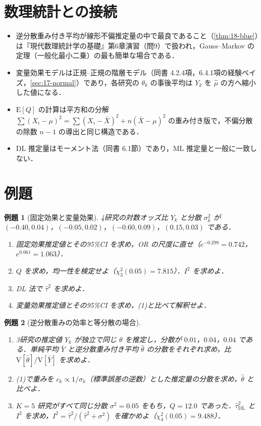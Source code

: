 \documentclass[a4paper,11pt,openany]{ltjsbook}
\newtheorem{reidai}{例題}[chapter]
\newcommand{\E}{\mathrm{E}}
\newcommand{\V}{\mathrm{V}}
\begin{document}
\section{数理統計との接続}\label{sec:18-link}
\begin{linkbox}
\begin{itemize}
\item 逆分散重み付き平均が線形不偏推定量の中で最良であること（\cref{thm:18-blue}）は『現代数理統計学の基礎』第6章演習（問9）で扱われ，Gauss--Markov の定理（一般化最小二乗）の最も簡単な場合である．
\item 変量効果モデルは正規--正規の階層モデル（同書 4.2.4項，6.4.1項の経験ベイズ，\cref{sec:17-normal}）であり，各研究の $\theta_k$ の事後平均は $Y_k$ を $\hat\mu$ の方へ縮小した値になる．
\item $\E[Q]$ の計算は平方和の分解 $\sum(X_i-\mu)^2=\sum(X_i-\bar X)^2+n(\bar X-\mu)^2$ の重み付き版で，不偏分散の除数 $n-1$ の導出と同じ構造である．
\item DL 推定量はモーメント法（同書 6.1節）であり，ML 推定量と一般に一致しない．
\end{itemize}
\end{linkbox}

\section{例題}\label{sec:18-ex}
\begin{reidai}[固定効果と変量効果]\label{reidai:18-1}
4研究の対数オッズ比 $Y_k$ と分散 $\sigma_k^2$ が $(-0.40,0.04)$，$(-0.05,0.02)$，$(-0.60,0.09)$，$(0.15,0.03)$ である．
\begin{enumerate}[label=(\arabic*)]
\item 固定効果推定値とその95\%CI を求め，OR の尺度に直せ（$e^{-0.298}=0.742$，$e^{0.061}=1.063$）．
\item $Q$ を求め，均一性を検定せよ（$\chi^2_3(0.05)=7.815$）．$I^2$ を求めよ．
\item DL 法で $\hat\tau^2$ を求めよ．
\item 変量効果推定値とその95\%CI を求め，(1)と比べて解釈せよ．
\end{enumerate}
\end{reidai}

\begin{reidai}[逆分散重みの効率と等分散の場合]\label{reidai:18-2}
\begin{enumerate}[label=(\arabic*)]
\item 3研究の推定値 $Y_k$ が独立で同じ $\theta$ を推定し，分散が $0.01$，$0.04$，$0.04$ である．単純平均 $\bar Y$ と逆分散重み付き平均 $\hat\theta$ の分散をそれぞれ求め，比 $\V[\hat\theta]/\V[\bar Y]$ を求めよ．
\item (1)で重みを $c_k\propto1/\sigma_k$（標準誤差の逆数）とした推定量の分散を求め，$\hat\theta$ と比べよ．
\item $K=5$ 研究がすべて同じ分散 $\sigma^2=0.05$ をもち，$Q=12.0$ であった．$\hat\tau^2_{\mathrm{DL}}$ と $I^2$ を求め，$I^2=\hat\tau^2/(\hat\tau^2+\sigma^2)$ を確かめよ（$\chi^2_4(0.05)=9.488$）．
\end{enumerate}
\end{reidai}
\end{document}
